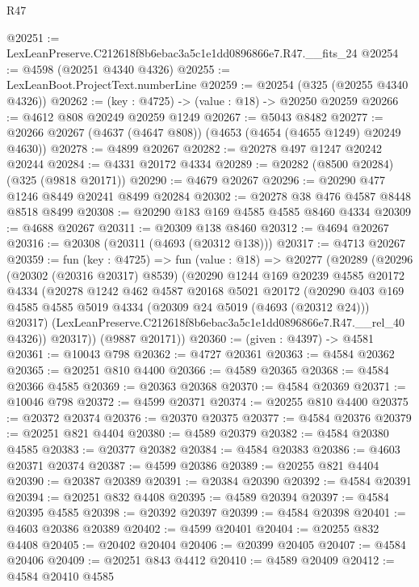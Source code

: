 \begin{lexlean}{R47}
\begin{coremodule}
@20251 := LexLeanPreserve.C212618f8b6ebac3a5c1e1dd0896866e7.R47.__fits_24
@20254 := @4598 (@20251 @4340 @4326)
@20255 := LexLeanBoot.ProjectText.numberLine
@20259 := @20254 (@325 (@20255 @4340 @4326))
@20262 := (key : @4725) -> (value : @18) -> @20250 @20259
@20266 := @4612 @808 @20249 @20259 @1249
@20267 := @5043 @8482
@20277 := @20266 @20267 (@4637 (@4647 @808)) (@4653 (@4654 (@4655 @1249) @20249 @4630))
@20278 := @4899 @20267
@20282 := @20278 @497 @1247 @20242 @20244
@20284 := @4331 @20172 @4334
@20289 := @20282 (@8500 @20284) (@325 (@9818 @20171))
@20290 := @4679 @20267
@20296 := @20290 @477 @1246 @8449 @20241 @8499 @20284
@20302 := @20278 @38 @476 @4587 @8448 @8518 @8499
@20308 := @20290 @183 @169 @4585 @4585 @8460 @4334
@20309 := @4688 @20267
@20311 := @20309 @138 @8460
@20312 := @4694 @20267
@20316 := @20308 (@20311 (@4693 (@20312 @138)))
@20317 := @4713 @20267
@20359 := fun (key : @4725) =>
  fun (value : @18) =>
  @20277
    (@20289
      (@20296
        (@20302 (@20316 @20317) @8539)
        (@20290
          @1244
          @169
          @20239
          @4585
          @20172
          @4334
          (@20278
            @1242
            @462
            @4587
            @20168
            @5021
            @20172
            (@20290
              @403
              @169
              @4585
              @4585
              @5019
              @4334
              (@20309 @24 @5019 (@4693 (@20312 @24)))
              @20317)
            (LexLeanPreserve.C212618f8b6ebac3a5c1e1dd0896866e7.R47.__rel_40 @4326))
          @20317))
      (@9887 @20171))
@20360 := (given : @4397) -> @4581
@20361 := @10043 @798
@20362 := @4727 @20361
@20363 := @4584 @20362
@20365 := @20251 @810 @4400
@20366 := @4589 @20365
@20368 := @4584 @20366 @4585
@20369 := @20363 @20368
@20370 := @4584 @20369
@20371 := @10046 @798
@20372 := @4599 @20371
@20374 := @20255 @810 @4400
@20375 := @20372 @20374
@20376 := @20370 @20375
@20377 := @4584 @20376
@20379 := @20251 @821 @4404
@20380 := @4589 @20379
@20382 := @4584 @20380 @4585
@20383 := @20377 @20382
@20384 := @4584 @20383
@20386 := @4603 @20371 @20374
@20387 := @4599 @20386
@20389 := @20255 @821 @4404
@20390 := @20387 @20389
@20391 := @20384 @20390
@20392 := @4584 @20391
@20394 := @20251 @832 @4408
@20395 := @4589 @20394
@20397 := @4584 @20395 @4585
@20398 := @20392 @20397
@20399 := @4584 @20398
@20401 := @4603 @20386 @20389
@20402 := @4599 @20401
@20404 := @20255 @832 @4408
@20405 := @20402 @20404
@20406 := @20399 @20405
@20407 := @4584 @20406
@20409 := @20251 @843 @4412
@20410 := @4589 @20409
@20412 := @4584 @20410 @4585

\end{coremodule}
\end{lexlean}
